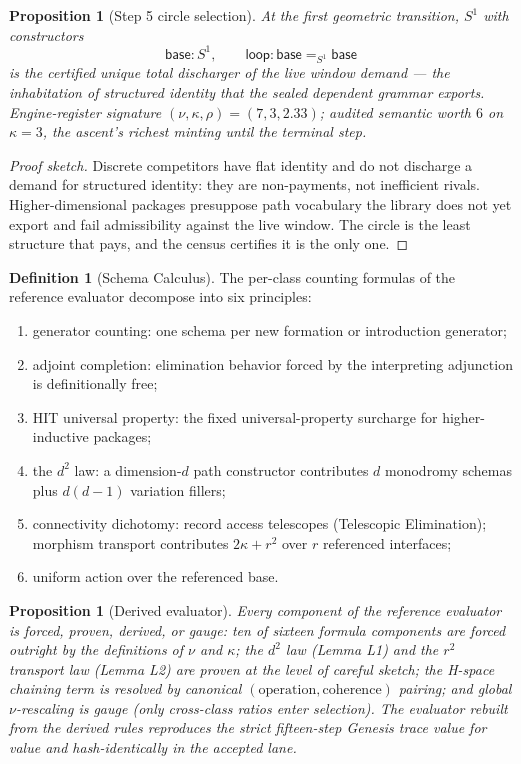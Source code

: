 \documentclass[11pt]{article}
\theoremstyle{plain}
\newtheorem{proposition}[theorem]{Proposition}
\theoremstyle{definition}
\newtheorem{definition}[theorem]{Definition}
\theoremstyle{remark}
\newenvironment{proofsketch}{\begin{proof}[Proof sketch]}{\end{proof}}
\begin{document}
\begin{proposition}[Step 5 circle selection]
At the first geometric transition, \(S^1\) with constructors
\[
\mathsf{base}:S^1,
\qquad
\mathsf{loop}:\mathsf{base}=_{S^1}\mathsf{base}
\]
is the certified unique total discharger of the live window demand --- the inhabitation of structured identity that the sealed dependent grammar exports. Engine-register signature \((\nu,\kappa,\rho)=(7,3,2.33)\); audited semantic worth \(6\) on \(\kappa=3\), the ascent's richest minting until the terminal step.
\end{proposition}

\begin{proofsketch}
Discrete competitors have flat identity and do not discharge a demand for structured identity: they are non-payments, not inefficient rivals. Higher-dimensional packages presuppose path vocabulary the library does not yet export and fail admissibility against the live window. The circle is the least structure that pays, and the census certifies it is the only one.
\end{proofsketch}

\begin{definition}[Schema Calculus]
The per-class counting formulas of the reference evaluator decompose into six principles:
\begin{enumerate}[leftmargin=*,label=P\arabic*.]
\item generator counting: one schema per new formation or introduction generator;
\item adjoint completion: elimination behavior forced by the interpreting adjunction is definitionally free;
\item HIT universal property: the fixed universal-property surcharge for higher-inductive packages;
\item the \(d^2\) law: a dimension-\(d\) path constructor contributes \(d\) monodromy schemas plus \(d(d-1)\) variation fillers;
\item connectivity dichotomy: record access telescopes (Telescopic Elimination); morphism transport contributes \(2\kappa+r^2\) over \(r\) referenced interfaces;
\item uniform action over the referenced base.
\end{enumerate}
\end{definition}

\begin{proposition}[Derived evaluator]
Every component of the reference evaluator is forced, proven, derived, or gauge: ten of sixteen formula components are forced outright by the definitions of \(\nu\) and \(\kappa\); the \(d^2\) law (Lemma L1) and the \(r^2\) transport law (Lemma L2) are proven at the level of careful sketch; the H-space chaining term is resolved by canonical \((\mathrm{operation},\mathrm{coherence})\) pairing; and global \(\nu\)-rescaling is gauge (only cross-class ratios enter selection). The evaluator rebuilt from the derived rules reproduces the strict fifteen-step Genesis trace value for value and hash-identically in the accepted lane.
\end{proposition}
\end{document}
